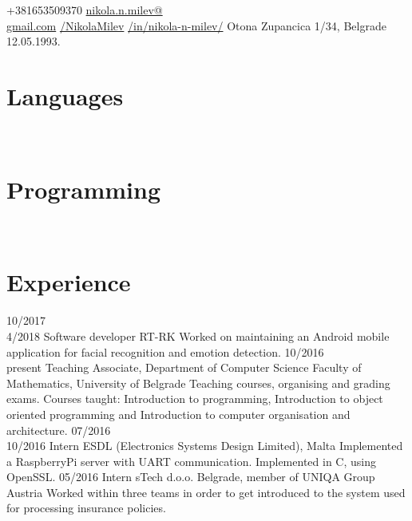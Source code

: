 \documentclass[a4paper]{my_cv}
\begin{document}
\thispagestyle{empty}	
	{+381653509370}
 	{\href{mailto:nikola.n.milev@gmail.com}{nikola.n.milev@\\gmail.com}}
	{ \href{https://github.com/NikolaMilev}{/NikolaMilev}} 	
 	{ \href{https://www.linkedin.com/in/nikola-n-milev/}{/in/nikola-n-milev/}}
	{ Otona Zupancica 1/34, Belgrade }
	{12.05.1993.}


 
\begin{aside}
\section{Languages}
\bodyfont{}
~
~
\section{Programming}
\end {aside}
~
~\\
\section{Experience}
\begin{entrylist}
\entry
    {10/2017~\textemdash \\4/2018}
    {Software developer}
    {RT-RK}
    {Worked on maintaining an Android mobile application for facial recognition and emotion detection.}
\entry
    {10/2016~\textemdash \\present}
    {Teaching Associate, Department of Computer Science}
    {Faculty of Mathematics, University of Belgrade}
    {Teaching courses, organising and grading exams. Courses taught: Introduction to programming, Introduction to object oriented programming and Introduction to computer organisation and architecture.}
\entry
    {07/2016~\textemdash \\10/2016}
    {Intern}
    {ESDL (Electronics Systems Design Limited), Malta}
    {Implemented a RaspberryPi server with UART communication. Implemented in C, using OpenSSL.}
\entry
    {05/2016}
    {Intern}
    {sTech d.o.o. Belgrade, member of UNIQA Group Austria}
    {Worked within three teams in order to get introduced to the system used for processing insurance policies. }
\end{entrylist}
\end{document}
